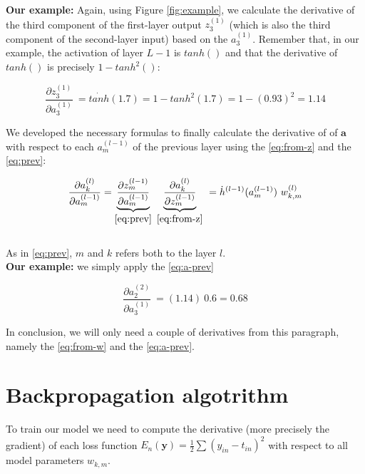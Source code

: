 \documentclass{article}
\begin{document}
\textbf{Our example:} Again, using  Figure \eqref{fig:example}, we calculate the derivative of the third component of the first-layer output $z_{3}^{( 1)}$ (which is also the third component of the second-layer input) based on the $a_{3}^{( 1)}$. Remember that, in our example, the activation of layer $L-1$ is $tanh()$ and that the derivative of $tanh()$ is precisely $1-tanh^2()$:

\begin{equation*}
\frac{\partial z_{3}^{( 1)}}{\partial a_{3}^{( 1)}} \ =\dot{tanh}( 1.7) =1-tanh^{2}( 1.7) =1-( 0.93)^{2}=1.14
\end{equation*}

\begin{center}\textleaf\end{center}


We developed the necessary formulas to finally calculate the derivative of  of $\boldsymbol{a}$ with respect to each $a_m^{(l-1)}$ of the previous layer using the \eqref{eq:from-z} and the \ref{eq:prev}:

\begin{gather}
\frac{\partial a_{k}^{(l)} }{ \partial a_{m}^{( l-1)}}  
= \underbrace{\frac{\partial z_{m}^{( l-1)}}{\partial a_{m}^{( l-1)}}}_{\eqref{eq:prev}} \ 
\underbrace{\frac{\partial a_{k}^{( l)}}{\partial z_{m}^{( l-1)}}}_{\eqref{eq:from-z}} \
=\dot{h}^{( l-1)}( a_{m}^{( l-1)}) \ w_{k,m}^{( l)} \label{eq:a-prev}
\end{gather}\\

As in \eqref{eq:prev},  $m$ and $k$ refers both to the layer $l$.\\

\textbf{Our example:} we simply apply the \eqref{eq:a-prev}


\begin{equation*}
\frac{\partial a_{2}^{( 2)}}{\partial a_{3}^{( 1)}} \  = (1.14)\ 0.6 = 0.68
\end{equation*}

In conclusion, we will only need a couple of derivatives from this paragraph, namely the \eqref{eq:from-w} and the \eqref{eq:a-prev}.

\section{Backpropagation algotrithm}
To train our model we need to compute the derivative (more precisely the gradient) of each loss function $\displaystyle E_{n}(\mathbf{y}) =\frac{1}{2}\sum ( y_{in} -t_{in})^{2}$ with respect to all model parameters $w_{k,m}$. 
\end{document}
